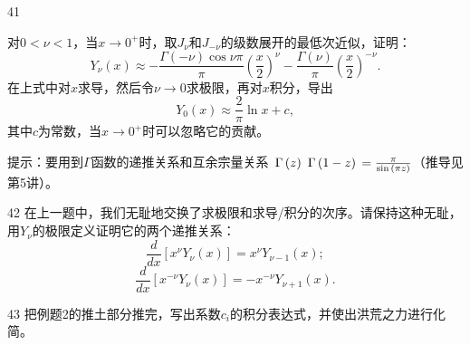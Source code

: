 \documentclass[CJK]{beamer}
\begin{document}
\begin{frame}
\bch
\bitem
\item[41]{对$0<\nu<1$，当$x\rightarrow 0^+$时，取$J_\nu$和$J_{-\nu}$的级数展开的最低次近似，证明：
  $$Y_\nu(x) \approx -\frac{\Gamma(-\nu)\cos{\nu\pi}}{\pi}\left(\frac{x}{2}\right)^\nu - \frac{\Gamma(\nu)}{\pi}\left(\frac{x}{2}\right)^{-\nu}. $$
  在上式中对$x$求导，然后令$\nu\rightarrow 0$求极限，再对$x$积分，导出
  $$ Y_0(x)\approx \frac{2}{\pi}\ln x + c,$$
  其中$c$为常数，当$x\rightarrow 0^+$时可以忽略它的贡献。

  \skiplines
      {\small \darkgreen 提示：要用到$\Gamma$函数的递推关系和互余宗量关系
        $\,\Gamma\left( z \right)\,\,\Gamma\left( 1-z \right)\,=\frac{\pi}{\sin{(\pi z)}}$（推导见第5讲）。
}}
  \eitem
\ech
\end{frame}



\begin{frame}
\bch
\bitem
\item[42]{在上一题中，我们无耻地交换了求极限和求导/积分的次序。请保持这种无耻，用$Y_\nu$的极限定义证明它的两个递推关系：
  $$ \frac{d}{dx}\left[x^\nu Y_\nu(x)\right] = x^\nu Y_{\nu -1}(x);$$
  $$ \frac{d}{dx}\left[x^{-\nu} Y_\nu(x)\right] = -x^{-\nu} Y_{\nu +1}(x).  $$
}
  \eitem
\ech
\end{frame}



\begin{frame}
\bch
\bitem
\item[43]{把例题2的推土部分推完，写出系数$c_i$的积分表达式，并使出洪荒之力进行化简。}
  \eitem
\ech
\end{frame}
\end{document}
